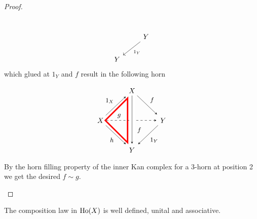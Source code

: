 \begin{proof}
\begin{itemize}
\[\begin{tikzcd}
            \\
            &
            Y
            \arrow[ld, "1_Y"]
            \\
            Y
        \end{tikzcd}
        \] which glued at $1_Y$ and $f$ result in the following horn
        \[
        \begin{tikzpicture}[>=stealth,->,shorten >=2pt,looseness=.5,auto]
            \matrix[anchor=center, column sep=1cm, row sep=1cm] at (0,0)
            {
                                & \node(X_1) {$X$};   &                 \\
             \node(X_0) {$X$};     &                  & \node(X_2) {$Y$};  \\
                                & \node(X_3) {$Y$};   &                 \\
            };
            \draw[line width=2pt,color=red] (-0.2,1.1) -- (-0.2,-1.1) -- (-1.3, 0) -- cycle;
            \begin{scope}[every node/.style={font=\small\itshape}]
                \draw (X_1) -- node [midway] {$f$} (X_2);
                \draw (X_0) -- node [midway] {$1_X$} (X_1);
                \draw (X_0) -- node [midway, swap] {$h$}(X_3);
                \draw [dashed] (X_0) -- node [near start] {$g$}(X_2);
                \draw [-,line width=8pt,draw=white]
                (X_1) -- node [pos=0.7] {$f$} (X_3);
                \draw (X_1) -- (X_3);
                \draw (X_2) -- node [midway] {$1_Y$} (X_3);
            \end{scope}
    \end{tikzpicture}
    \]
    By the horn filling property of the inner Kan complex for a 3-horn at position 2 we get the desired $f \sim g$.
    \end{itemize}
\end{proof}

\begin{prop}
    The composition law in $\operatorname{Ho}(X)$ is well defined, unital and associative.
\end{prop}

